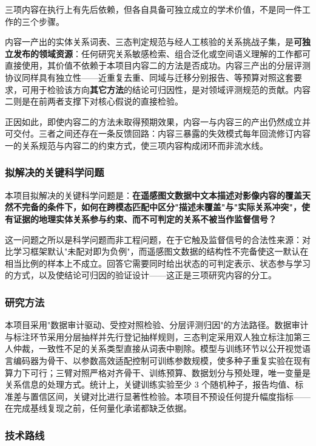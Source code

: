 三项内容在执行上有先后依赖，但各自具备可独立成立的学术价值，不是同一件工作的三个步骤。

内容一产出的实体关系词表、三态判定规范与经人工核验的关系挑战子集，是\textbf{可独立发布的领域资源}：任何研究关系敏感检索、组合泛化或空间语义理解的工作都可直接使用，其价值不依赖于本项目内容二的方法是否成功。内容三产出的分层评测协议同样具有独立性——近重复去重、同域与迁移分别报告、等预算对照这套要求，可用于检验该方向\textbf{其它方法}的结论可归因性，是对领域评测规范的贡献。内容二则是在前两者支撑下对核心假说的直接检验。

正因如此，即使内容二的方法未取得预期效果，内容一与内容三的产出仍然成立并可交付。三者之间还存在一条反馈回路：内容三暴露的失效模式每年回流修订内容一的关系规范与内容二的约束方式，使三项内容构成闭环而非流水线。

\subsubsection{拟解决的关键科学问题}

本项目拟解决的关键科学问题是：\textbf{在遥感图文数据中文本描述对影像内容的覆盖天然不完备的条件下，如何在跨模态匹配中区分"描述未覆盖"与"实际关系冲突"，使有证据的地理实体关系参与约束、而不可判定的关系不被当作监督信号？}

这一问题之所以是科学问题而非工程问题，在于它触及监督信号的合法性来源：对比学习框架默认"未配对即为负例"，而遥感图文数据的结构性不完备使这一默认在相当比例的样本上不成立。回答它需要同时给出状态的可判定表示、状态参与学习的方式，以及使结论可归因的验证设计——这正是三项研究内容的分工。

\subsubsection{研究方法}

本项目采用"数据审计驱动、受控对照检验、分层评测归因"的方法路径。数据审计与标注环节采用分层抽样并先行登记抽样规则，三态判定采用双人独立标注加第三人仲裁，一致性不足的关系类型直接从词表中剔除。模型与训练环节以公开视觉语言编码器为骨干、以参数高效适配控制可训练参数规模，使多种子重复实验在现有算力下可行；三臂对照严格对齐骨干、训练预算、数据划分与预处理，唯一变量是关系信息的处理方式。统计上，关键训练实验至少 3 个随机种子，报告均值、标准差与置信区间，关键对比进行显著性检验。本项目不预设任何提升幅度指标——在完成基线复现之前，任何量化承诺都缺乏依据。

\subsubsection{技术路线}

